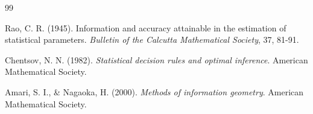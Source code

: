 \begin{thebibliography}{99}
	
	Rao, C. R. (1945).
	Information and accuracy attainable in the estimation of statistical parameters.
	\textit{Bulletin of the Calcutta Mathematical Society}, 37, 81-91.
	
	Chentsov, N. N. (1982).
	\textit{Statistical decision rules and optimal inference}.
	American Mathematical Society.
	
	Amari, S. I., \& Nagaoka, H. (2000).
	\textit{Methods of information geometry}.
	American Mathematical Society.

\end{thebibliography}
